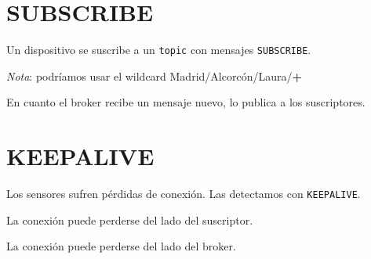 \documentclass[xcolor={x11names}]{beamer}
\begin{document}
\section{SUBSCRIBE}
\begin{frame}{\secname}
    Un dispositivo se suscribe a
    un \texttt{topic} con
    mensajes \texttt{SUBSCRIBE}.

    \vspace{1em}

    \begin{figure}
        
    \end{figure}


    \emph{Nota}: podríamos usar el wildcard
    {\color{Firebrick3}Madrid}/{\color{Gold3}Alcorcón}/{\color{DodgerBlue3}Laura}/{\color{OliveDrab4}\textbf{+}}
\end{frame}




\begin{frame}{\secname}
    En cuanto el broker recibe un
    mensaje nuevo, lo publica a los
    suscriptores.
    \begin{figure}
        
    \end{figure}
\end{frame}




\section{KEEPALIVE}
\begin{frame}{\secname}
    Los sensores sufren pérdidas de
    conexión. Las detectamos con
    \texttt{KEEPALIVE}.
    
    \begin{figure}
        
    \end{figure}
\end{frame}


\begin{frame}{\secname}
    La conexión puede perderse del
    lado del suscriptor.
    \begin{figure}
        
    \end{figure}

    La conexión puede perderse del
    lado del broker.
    \begin{figure}
        
    \end{figure}
\end{frame}
\end{document}
